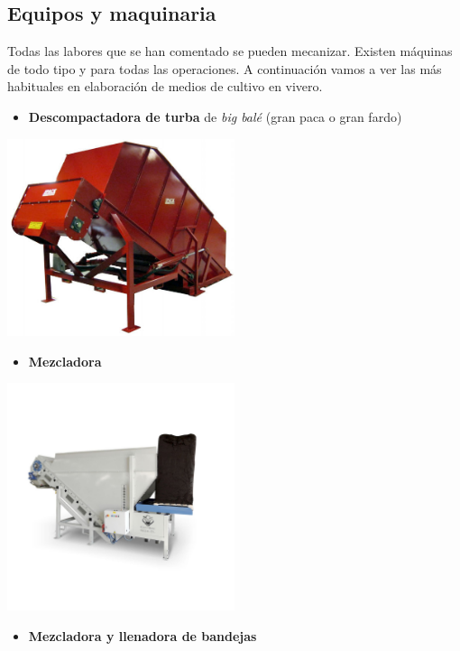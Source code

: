 \documentclass[a4paper,12pt,oneside]{article}
\begin{document}
\subsection{Equipos y maquinaria}
\label{sec:org7115e1c}
Todas las labores que se han comentado se pueden mecanizar. Existen máquinas de
todo tipo y para todas las operaciones. A continuación vamos a ver las más
habituales en elaboración de medios de cultivo en vivero.
\begin{itemize}
\item \textbf{Descompactadora de turba} de \emph{big balé} (gran paca o gran fardo)
\end{itemize}
\begin{center}
\includegraphics[width=0.5\textwidth]{./img_uf1596/big_bale.jpg}
\end{center}
\begin{itemize}
\item \textbf{Mezcladora}
\end{itemize}
\begin{center}
\includegraphics[width=0.5\textwidth]{./img_uf1596/mezcladora.jpg}
\end{center}
\begin{itemize}
\item \textbf{Mezcladora y llenadora de bandejas}
\end{itemize}
\end{document}
